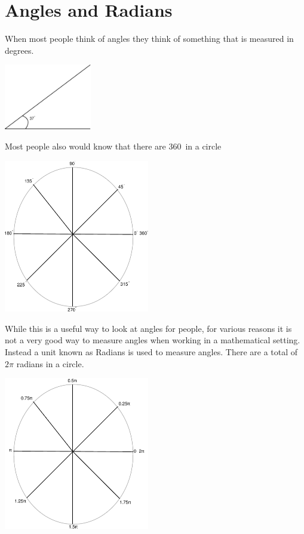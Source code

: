 \documentclass[]{book}
\begin{document}
\chapter{Angles and Radians}

When most people think of angles they think of something that is measured in
degrees.

\bigskip
\includegraphics[width=1.5in]{images/angledegree}
\bigskip


Most people also would know that there are 360\textdegree\ in a circle

\bigskip
\includegraphics[width=2.5in]{images/circledegree}
\bigskip

While this is a useful way to look at angles for people, for various reasons
it is not a very good way to measure angles when working in a mathematical
setting.  Instead a unit known as Radians is used to measure angles.
There are a total of $2\pi$ radians in a circle.

\bigskip
\includegraphics[width=2.5in]{images/circleradian}
\bigskip
\end{document}
